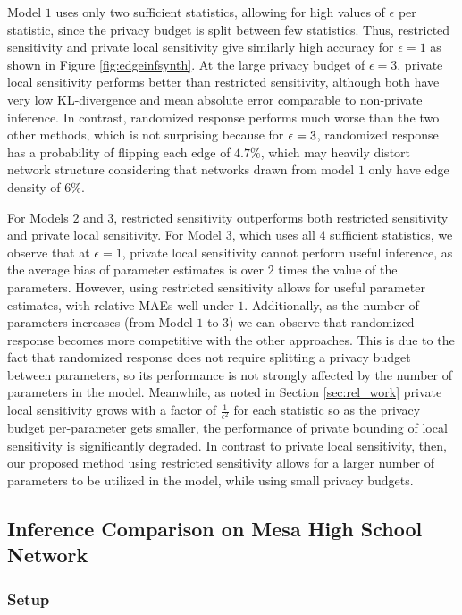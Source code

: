 Model $1$ uses only two sufficient statistics, allowing for high values of $\epsilon$ per statistic, since the privacy budget is split between few statistics. Thus, restricted sensitivity and private local sensitivity give similarly high accuracy for $\epsilon=1$ as shown in Figure \ref{fig:edgeinfsynth}. At the large privacy budget of $\epsilon=3$, private local sensitivity performs better than restricted sensitivity, although both have very low KL-divergence and mean absolute error comparable to non-private inference. In contrast, randomized response performs much worse than the two other methods, which is not surprising because for $\epsilon = 3$, randomized response has a probability of flipping each edge of $4.7\%$, which may heavily distort network structure considering that networks drawn from model $1$ only have edge density of $6\%$.

For Models $2$ and $3$, restricted sensitivity outperforms both restricted sensitivity and private local sensitivity. For Model $3$, which uses all $4$ sufficient statistics, we observe that at $\epsilon=1$, private local sensitivity cannot perform useful inference, as the average bias of parameter estimates is over $2$ times the value of the parameters. However, using restricted sensitivity allows for useful parameter estimates, with relative MAEs well under $1$. Additionally, as the number of parameters increases (from Model $1$ to $3$) we can observe that randomized response becomes more competitive with the other approaches. This is due to the fact that randomized response does not require splitting a privacy budget between parameters, so its performance is not strongly affected by the number of parameters in the model. Meanwhile, as noted in Section \ref{sec:rel_work} private local sensitivity grows with a factor of $\frac{1}{\epsilon^2}$ for each statistic so as the privacy budget per-parameter gets smaller, the performance of private bounding of local sensitivity is significantly degraded. In contrast to private local sensitivity, then, our proposed method using restricted sensitivity allows for a larger number of parameters to be utilized in the model, while using small privacy budgets.

  \subsection{Inference Comparison on Mesa High School Network}
  
 \subsubsection{Setup}
 
